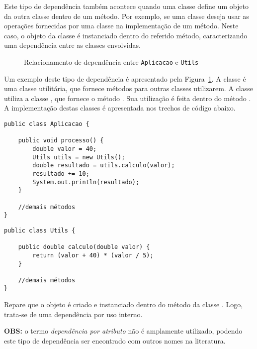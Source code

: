 Este tipo de dependência também acontece quando uma classe define um objeto da outra classe dentro de um método. Por exemplo, se uma classe  deseja usar as operações fornecidas por uma classe  na implementação de um método. Neste caso, o objeto da classe  é instanciado dentro do referido método, caracterizando uma dependência entre as classes envolvidas.

\begin{figure}[h]
	\centering
	
	
	\caption{Relacionamento de dependência entre \texttt{Aplicacao} e \texttt{Utils}}
	\label{fig:dependencia-aplicacao-utils}
\end{figure}

Um exemplo deste tipo de dependência é apresentado pela Figura~\ref{fig:dependencia-aplicacao-utils}. A classe  é uma classe utilitária, que fornece métodos para outras classes utilizarem. A classe  utiliza a classe , que fornece o método . Sua utilização é feita dentro do método . A implementação destas classes é apresentada nos trechos de código abaixo.

\begin{verbatim}
public class Aplicacao {
	
	public void processo() {
		double valor = 40;
		Utils utils = new Utils();
		double resultado = utils.calculo(valor);
		resultado += 10;
		System.out.println(resultado);
	}
	
	//demais métodos
}
\end{verbatim}

\begin{verbatim}
public class Utils {
	
	public double calculo(double valor) {
		return (valor + 40) * (valor / 5);
	}
	
	//demais métodos
}
\end{verbatim}

Repare que o objeto é criado e instanciado dentro do método  da classe . Logo, trata-se de uma dependência por uso interno.

\textbf{OBS:} o termo \textit{dependência por atributo} não é amplamente utilizado, podendo este tipo de dependência ser encontrado com outros nomes na literatura.